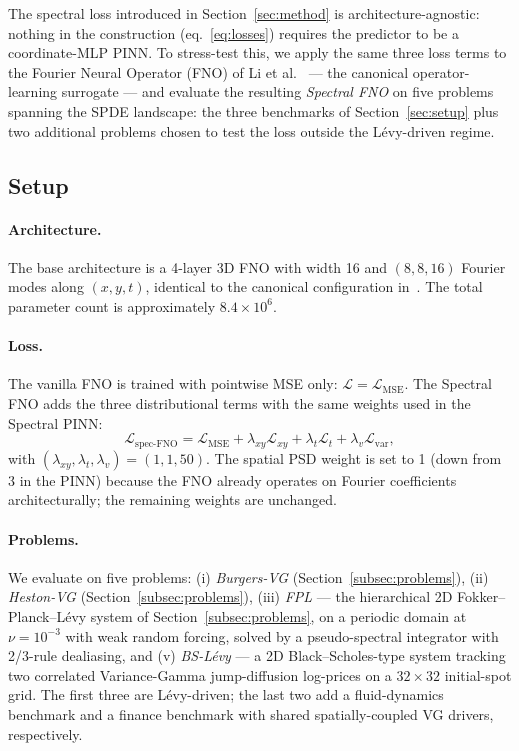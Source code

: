 \documentclass[review,12pt]{elsarticle}
\begin{document}
\label{sec:spectral-fno}

The spectral loss introduced in Section~\ref{sec:method} is
architecture-agnostic: nothing in the construction
(eq.~\ref{eq:losses}) requires the predictor to be a coordinate-MLP
PINN. To stress-test this, we apply the same three loss terms to the
Fourier Neural Operator (FNO) of Li et al.~\cite{Li2021FNO} ---
the canonical operator-learning surrogate --- and evaluate the
resulting \emph{Spectral FNO} on five problems spanning the
SPDE landscape: the three benchmarks of Section~\ref{sec:setup}
plus two additional problems chosen to test the loss outside the
L\'evy-driven regime.

\subsection{Setup}
\label{subsec:fno-setup}

\paragraph{Architecture.}
The base architecture is a 4-layer 3D FNO with width 16 and
$(8, 8, 16)$ Fourier modes along $(x, y, t)$, identical to the
canonical configuration in~\cite{Li2021FNO}. The total parameter
count is approximately $8.4 \times 10^{6}$.

\paragraph{Loss.}
The vanilla FNO is trained with pointwise MSE only:
$\mathcal{L} = \mathcal{L}_{\mathrm{MSE}}$. The Spectral FNO adds
the three distributional terms with the same weights used in the
Spectral PINN:
\begin{equation}
\mathcal{L}_{\text{spec-FNO}} = \mathcal{L}_{\mathrm{MSE}}
+ \lambda_{xy} \mathcal{L}_{xy}
+ \lambda_{t}  \mathcal{L}_{t}
+ \lambda_{v}  \mathcal{L}_{\mathrm{var}},
\end{equation}
with $(\lambda_{xy}, \lambda_{t}, \lambda_{v}) = (1, 1, 50)$. The
spatial PSD weight is set to 1 (down from 3 in the PINN) because the
FNO already operates on Fourier coefficients architecturally; the
remaining weights are unchanged.

\paragraph{Problems.}
We evaluate on five problems:
(i) \emph{Burgers-VG} (Section~\ref{subsec:problems}),
(ii) \emph{Heston-VG} (Section~\ref{subsec:problems}),
(iii) \emph{FPL} --- the hierarchical 2D Fokker--Planck--L\'evy
system of Section~\ref{subsec:problems},
on a periodic domain at $\nu = 10^{-3}$ with weak random forcing,
solved by a pseudo-spectral integrator with 2/3-rule dealiasing,
and
(v) \emph{BS-L\'evy} --- a 2D Black--Scholes-type system tracking
two correlated Variance-Gamma jump-diffusion log-prices on a
$32 \times 32$ initial-spot grid.
The first three are L\'evy-driven; the last two add a
fluid-dynamics benchmark and a finance benchmark with shared
spatially-coupled VG drivers, respectively.
\end{document}
